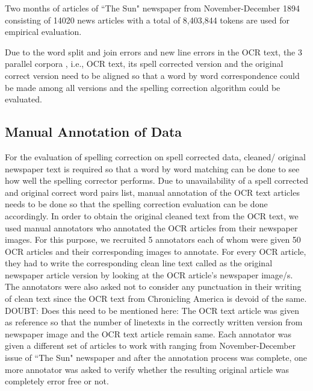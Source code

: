 \documentclass[preprint,11pt]{elsarticle}
\begin{document}
Two months of articles of ``The Sun" newspaper from November-December 1894 consisting of 14020 news articles with a total of 8,403,844 tokens are used for empirical evaluation. %



 
Due to the word split and join errors and new line errors in the OCR text, the 3 parallel corpora , i.e., OCR text, its spell corrected version and the original correct version need to be aligned so that a word by word correspondence could be made among all versions and the spelling correction algorithm could be evaluated.

\subsection{Manual Annotation of Data}
For the evaluation of spelling correction on spell corrected data, cleaned/ original newspaper text is required so that a word by word matching can be done to see how well the spelling corrector performs. Due to unavailability of a spell corrected and original correct word pairs list, manual annotation of the OCR text articles needs to be done so that the spelling correction evaluation can be done accordingly. 
In order to obtain the original cleaned text from the OCR text, we used manual annotators who annotated the OCR articles from their newspaper images. For this purpose, we recruited 5 annotators each of whom were given 50 OCR articles and their corresponding images to annotate. For every OCR article, they had to write the corresponding clean line text called as the original newspaper article version by looking at the OCR article's newspaper image/s. The annotators were also asked not to consider any punctuation in their writing of clean text since the OCR text from Chronicling America is devoid of the same. 
DOUBT: Does this need to be mentioned here: The OCR text article was given as reference so that the number of linetexts in the correctly written version from newspaper image and the OCR text article remain same.
 Each annotator was given a different set of articles to work with ranging from November-December issue of ``The Sun" newspaper and after the annotation process was complete, one more annotator was asked to verify whether the resulting original article was completely error free or not.
\end{document}
